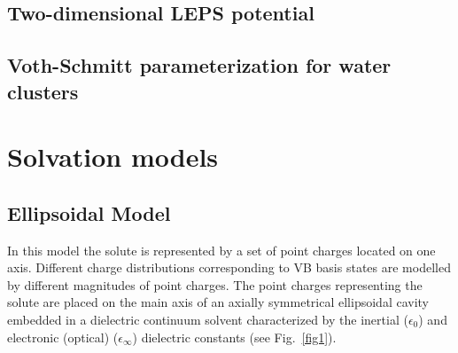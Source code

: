 \documentclass[oneside,11pt,openany]{book}
\begin{document}
\subsection{Two-dimensional LEPS potential}

\subsection{Voth-Schmitt parameterization for water clusters}






\section{Solvation models}
\subsection{Ellipsoidal Model}
In this model the solute is represented by a set of point charges
located on one axis. Different charge distributions corresponding
to VB basis states are modelled by different magnitudes of point
charges. The point charges representing the solute are placed
on the main axis of an axially symmetrical ellipsoidal cavity
embedded in a dielectric continuum solvent characterized by the
inertial ($\epsilon_0$) and electronic (optical) ($\epsilon_\infty$)
dielectric constants (see Fig.~\ref{fig1}).
\end{document}
